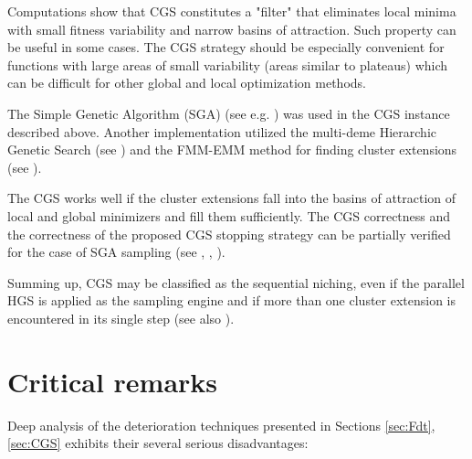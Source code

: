 Computations show that CGS constitutes a "filter" that eliminates local
minima with small fitness variability and narrow basins of attraction.
Such property can be useful in some cases. The CGS strategy should
be especially convenient for functions with large areas of small variability
(areas similar to plateaus) which can be difficult
for other global and local optimization methods.

The Simple Genetic Algorithm (SGA) (see e.g. \cite{Schaefer2007}) 
was used in the CGS instance described above. 
Another implementation utilized the multi-deme Hierarchic Genetic Search
(see \cite{SchaeferKolodziej2003})
and the FMM-EMM method for finding cluster extensions 
(see \cite{SchaeferAdamska2004}).

The CGS works well if the cluster extensions fall into 
the basins of attraction of local and global minimizers and
fill them sufficiently. The CGS correctness and the correctness
of the proposed CGS stopping strategy can be partially verified
for the case of SGA sampling (see \cite{Telega1999}, 
\cite{SchaeferJablonski2001}, \cite{Schaefer2007}).

Summing up, CGS may be classified as the sequential niching, even if the
parallel HGS is applied as the sampling engine and if more than one
cluster extension is encountered in its single step (see also
\cite{SchaeferWolny2011}).











\section{Critical remarks}
\label{sec:CritRem}

Deep analysis of the deterioration techniques presented in Sections
\ref{sec:Fdt}, \ref{sec:CGS}
exhibits their several serious disadvantages:

